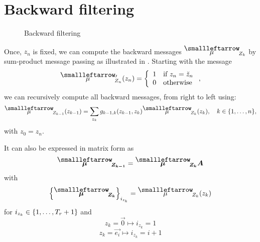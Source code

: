 \documentclass{article}
\begin{document}
    \section{Backward filtering} \label{sec:backward}

    \begin{figure}[!ht]
      \centering
      \caption{Backward filtering} \label{fig:backward}
    \end{figure}
  
    Once, $z_n$ is fixed, we can compute the backward messages $\msgb{\mu}{Z_{k}}$ by sum-product message passing as illustrated in 
    . Starting with the message 
    \begin{equation}
      \msgb{\mu}{Z_{n}}'(z_n) = \left\{
        \begin{array}{ll}
          1 & \mbox{if } z_n = \breve{z}_n\\
          0 & \mbox{otherwise} \\
        \end{array}
      \right.,
    \end{equation}
    we can recursively compute all backward messages, from right to left using:
    \begin{equation}
      \msgb{\mu}{Z_{k-1}}(z_{k-1}) = \sum_{z_{k}} g_{k-1, k}(z_{k-1}, z_{k}) \msgb{\mu}{Z_{k}}(z_{k}), \quad k \in \{1, \dots, n\},
    \end{equation}
    with $z_0 = z_n$.
    
    It can also be expressed in matrix form as
    \begin{equation}
      \mat{\msgb{\mu}{Z_{k-1}}} = \mat{\msgb{\mu}{Z_{k}}} \mat{A}
    \end{equation}
    with 
    \begin{equation}
      \left\{\mat{\msgb{\mu}{Z_{k}}}\right\}_{i_{z_k}} = \msgb{\mu}{Z_{k}}(z_{k})
    \end{equation}
    for $i_{z_k} \in \{1, \dots, T_r + 1\}$ and
    \begin{equation}
      z_k = \vec{0} \mapsto i_{z_k} = 1
    \end{equation}
    \begin{equation}
      z_k = \vec{e_{i}} \mapsto i_{z_k} = i + 1
    \end{equation}
\end{document}
